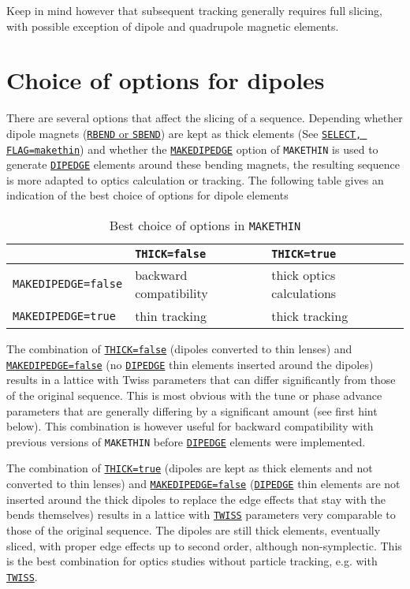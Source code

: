 Keep in mind however that subsequent tracking generally requires full
slicing, with possible exception of dipole and quadrupole magnetic elements. 

\section{Choice of options for dipoles}

There are several options that affect the slicing of a sequence. 
Depending whether dipole magnets (\hyperref[sec:bend]{\texttt{RBEND} 
or \texttt{SBEND}}) are kept as thick elements 
(See \hyperref[sec:select]{\texttt{SELECT, FLAG=makethin}}) and 
whether the \hyperref[sec:makethin]{\texttt{MAKEDIPEDGE}} option 
of \texttt{MAKETHIN} is used to generate 
\hyperref[sec:dipedge]{\texttt{DIPEDGE}} elements around these bending magnets, 
the resulting sequence is more adapted to optics calculation or tracking. 
The following table gives an indication of the best choice of options for 
dipole elements 

\begin{table}[ht]
  \caption{Best choice of options in \texttt{MAKETHIN}}
  \vspace{1ex}
  \centering
  \begin{tabular}{|l|l|l|}
    \hline
    & \texttt{THICK=false} & \texttt{THICK=true}\\
    \hline
    \texttt{MAKEDIPEDGE=false} & backward compatibility & thick optics calculations \\
    \hline
    \texttt{MAKEDIPEDGE=true} & thin tracking & thick tracking \\
    \hline
  \end{tabular}
\end{table}

The combination of \hyperref[sec:numberofslices]{\texttt{THICK=false}} 
(dipoles converted to thin lenses) 
and \hyperref[sec:makethin]{\texttt{MAKEDIPEDGE=false}} 
(no \hyperref[sec:dipedge]{\texttt{DIPEDGE}} 
thin elements inserted around the dipoles) results in a lattice with 
Twiss parameters that can differ significantly from those of 
the original sequence. 
This is most obvious with the tune or phase advance parameters 
that are generally differing by a significant amount (see first 
hint below). This combination is however useful for backward compatibility 
with previous versions of \texttt{MAKETHIN} before 
\hyperref[sec:dipedge]{\texttt{DIPEDGE}} elements were
implemented. 

The combination of \hyperref[sec:numberofslices]{\texttt{THICK=true}} 
(dipoles are kept as thick elements and not converted to thin lenses) 
and \hyperref[sec:makethin]{\texttt{MAKEDIPEDGE=false}} 
(\hyperref[sec:dipedge]{\texttt{DIPEDGE}} thin elements 
are not inserted around the thick dipoles to replace the edge effects 
that stay with the bends themselves) 
results in a lattice with \hyperref[chap:twiss]{\texttt{TWISS}} parameters 
very comparable to those of the original sequence. The dipoles are still 
thick elements, eventually sliced, with proper edge effects up to second 
order, although non-symplectic.
This is the best combination for optics studies without particle tracking, 
e.g. with \hyperref[chap:twiss]{\texttt{TWISS}}. 

